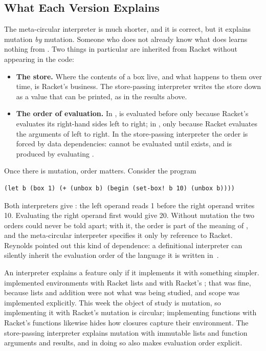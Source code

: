 \subsection{What Each Version Explains}

The meta-circular interpreter is much shorter, and it is correct, but it explains mutation \emph{by} mutation. Someone who does not already know what  does learns nothing from . Two things in particular are inherited from Racket without appearing in the code:
\begin{itemize}
  \item \textbf{The store.} Where the contents of a box live, and what happens to them over time, is Racket's business. The store-passing interpreter writes the store down as a value that can be printed, as in the  results above.
  \item \textbf{The order of evaluation.} In ,  is evaluated before  only because Racket's  evaluates its right-hand sides left to right; in , only because Racket evaluates the arguments of \code{+} left to right. In the store-passing interpreter the order is forced by data dependencies:  cannot be evaluated until  exists, and  is produced by evaluating .
\end{itemize}
Once there is mutation, order matters. Consider the program
\begin{lstlisting}
(let b (box 1) (+ (unbox b) (begin (set-box! b 10) (unbox b))))
\end{lstlisting}
Both interpreters give : the left operand reads 1 before the right operand writes 10. Evaluating the right operand first would give 20. Without mutation the two orders could never be told apart; with it, the order is part of the meaning of \code{+}, and the meta-circular interpreter specifies it only by reference to Racket. Reynolds pointed out this kind of dependence: a definitional interpreter can silently inherit the evaluation order of the language it is written in~\cite{Reynolds}.

\begin{keypoint}
An interpreter explains a feature only if it implements it with something simpler.  implemented environments with Racket lists and  with Racket's \code{+}; that was fine, because lists and addition were not what was being studied, and scope was implemented explicitly. This week the object of study is mutation, so implementing it with Racket's mutation is circular; implementing functions with Racket's functions likewise hides how closures capture their environment. The store-passing interpreter explains mutation with immutable lists and function arguments and results, and in doing so also makes evaluation order explicit.
\end{keypoint}

